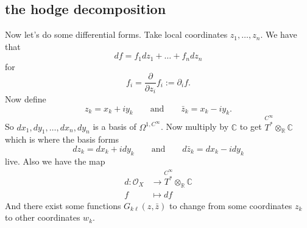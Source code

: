 \documentclass{article}
\newcommand{\R}{\mathbb{R}}
\newcommand{\C}{\mathbb{C}}
\newcommand{\Oc}{\mathcal{O}}
\newcommand{\Cinf}{C^\infty}
\begin{document}
\subsection{the hodge decomposition}
Now let's do some differential forms. Take local coordinates $z_1,\ldots,z_n$. We have that
\[df=f_1dz_1+\ldots+f_ndz_n\]
for
\[f_i=\frac{\partial}{\partial z_i}f_i:=\partial_if.\]
Now define
\[z_k=x_k+iy_k\qquad\text{and}\qquad\bar{z}_k=x_k-iy_k.\]
So $dx_1,dy_1,\ldots,dx_n,dy_n$ is a basis of $\Omega^{1,\Cinf}$. Now multiply by $\C$ to get $\overset{\Cinf}{T^*}\otimes_\R\C$ which is where the basis forms
\[dz_k=dx_k+idy_k\qquad\text{and}\qquad d\bar{z}_k=dx_k-idy_k\]
live. Also we have the map
\begin{align*}
	d:\Oc_X&\to\overset{\Cinf}{T^*}\otimes_\R\C\\
	f&\mapsto df
\end{align*}
And there exist some functions $G_{k\ell}(z,\bar{z})$ to change from some coordinates $z_k$ to other coordinates $w_k$.
\end{document}
